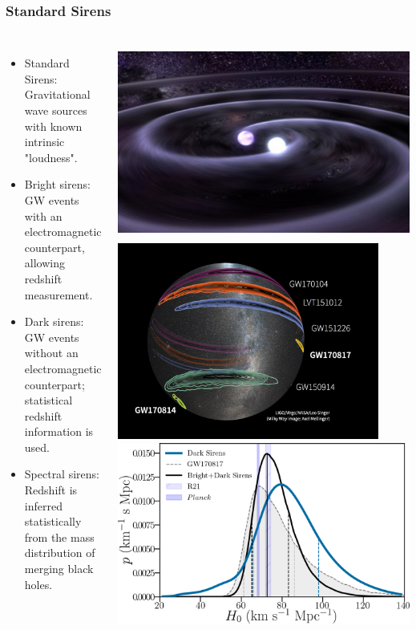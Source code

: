 \documentclass[aspectratio=169]{beamer}
\begin{document}
\begin{frame}
    \frametitle{Standard Sirens}
    \begin{columns}
        \begin{itemize}
            \item Standard Sirens: Gravitational wave sources with known intrinsic "loudness". \hfill {} 
            \item Bright sirens: GW events with an electromagnetic counterpart, allowing redshift measurement. \hfill {}
            \item Dark sirens: GW events without an electromagnetic counterpart; statistical redshift information is used. \hfill {}
            \item Spectral sirens: Redshift is inferred statistically from the mass distribution of merging black holes. \hfill {}
        \end{itemize}
        
        \includegraphics[height=0.33\textwidth]{figures/gw.jpg}%
        \includegraphics[height=0.33\textwidth]{figures/gw_local.jpg}
        \includegraphics[width=\textwidth]{figures/posterior_O3_dr9beta_170817.png} %
        
    \end{columns}
\end{frame}
\end{document}
